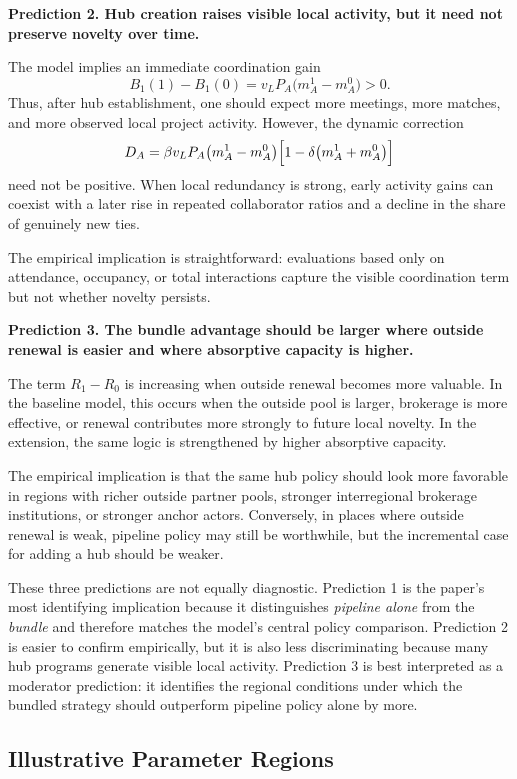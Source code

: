 \noindent\textbf{Prediction 2. Hub creation raises visible local activity, but it need not preserve novelty over time.}

The model implies an immediate coordination gain
\[
B_1(1)-B_1(0)=v_LP_A\bigl(m_A^1-m_A^0\bigr)>0.
\]
Thus, after hub establishment, one should expect more meetings, more matches, and more observed local project activity. However, the dynamic correction
\[
D_A
=
\beta v_LP_A\bigl(m_A^1-m_A^0\bigr)\Bigl[1-\delta\bigl(m_A^1+m_A^0\bigr)\Bigr]
\]
need not be positive. When local redundancy is strong, early activity gains can coexist with a later rise in repeated collaborator ratios and a decline in the share of genuinely new ties.

The empirical implication is straightforward: evaluations based only on attendance, occupancy, or total interactions capture the visible coordination term but not whether novelty persists.

\noindent\textbf{Prediction 3. The bundle advantage should be larger where outside renewal is easier and where absorptive capacity is higher.}

The term $R_1-R_0$ is increasing when outside renewal becomes more valuable. In the baseline model, this occurs when the outside pool is larger, brokerage is more effective, or renewal contributes more strongly to future local novelty. In the extension, the same logic is strengthened by higher absorptive capacity.

The empirical implication is that the same hub policy should look more favorable in regions with richer outside partner pools, stronger interregional brokerage institutions, or stronger anchor actors. Conversely, in places where outside renewal is weak, pipeline policy may still be worthwhile, but the incremental case for adding a hub should be weaker.

These three predictions are not equally diagnostic. Prediction 1 is the paper's most identifying implication because it distinguishes \emph{pipeline alone} from the \emph{bundle} and therefore matches the model's central policy comparison. Prediction 2 is easier to confirm empirically, but it is also less discriminating because many hub programs generate visible local activity. Prediction 3 is best interpreted as a moderator prediction: it identifies the regional conditions under which the bundled strategy should outperform pipeline policy alone by more.

\subsection{Illustrative Parameter Regions}

